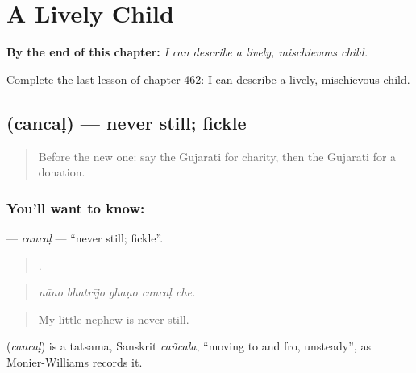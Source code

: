 
\chapter{A Lively Child}
\label{ch:gu-a-lively-child}

\begin{chapteropening}
\textbf{By the end of this chapter:} \emph{I can describe a lively, mischievous child.}

Complete the last lesson of chapter 462: I can describe a lively, mischievous child.
\end{chapteropening}

\section[\texorpdfstring{\gu{ચંચળ} (cancaḷ)}{ચંચળ (cancaḷ)}]{ (cancaḷ) — never still; fickle}

\label{lesson:GU-C462-cancal}



\begin{quote}
Before the new one: say the Gujarati for charity, then the Gujarati for a donation.
\end{quote}

\subsection*{You'll want to know: }
\textbf{} — \emph{cancaḷ} — \textquotedblleft{}never still; fickle\textquotedblright{}.

\begin{quote}
    .
\end{quote}

\begin{quote}
\emph{nāno bhatrījo ghaṇo cancaḷ che.}
\end{quote}

\begin{quote}
My little nephew is never still.
\end{quote}

\begin{cousinweb}
\textbf{} (\emph{cancaḷ}) is a tatsama, Sanskrit \emph{cañcala}, \textquotedblleft{}moving to and fro, unsteady\textquotedblright{}, as Monier-Williams records it.
\end{cousinweb}

